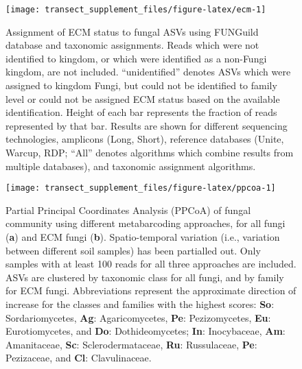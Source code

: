 \documentclass[
]{article}
\begin{document}
\begin{figure}

{\centering \texttt{[image: transect\_supplement\_files/figure-latex/ecm-1]} 

}

\caption[Assignment of ECM status to fungal ASVs using FUNGuild database and taxonomic assignments]{Assignment of ECM status to fungal ASVs using FUNGuild database and taxonomic assignments. Reads which were not identified to kingdom, or which were identified as a non-Fungi kingdom, are not included.
``unidentified'' denotes ASVs which were assigned to kingdom Fungi, but could not be identified to family level or could not be assigned ECM status based on the available identification.
Height of each bar represents the fraction of reads represented by that bar.
Results are shown for different sequencing technologies, amplicons (Long, Short), reference databases (Unite, Warcup, RDP; ``All'' denotes algorithms which combine results from multiple databases), and taxonomic assignment algorithms.}\label{fig:ecm}
\end{figure}









\begin{figure}

{\centering \texttt{[image: transect\_supplement\_files/figure-latex/ppcoa-1]} 

}

\caption[Partial Principal Coordinates Analysis (PPCoA) of fungal community using different metabarcoding approaches]{Partial Principal Coordinates Analysis (PPCoA) of fungal community using different metabarcoding approaches, for all fungi (\textbf{a}) and ECM fungi (\textbf{b}).
Spatio-temporal variation (i.e., variation between different soil samples) has been partialled out.
Only samples with at least 100 reads for all three approaches are included.
ASVs are clustered by taxonomic class for all fungi, and by family for ECM fungi.
Abbreviations represent the approximate direction of increase for the classes and families with the highest scores: \textbf{So}: Sordariomycetes, \textbf{Ag}: Agaricomycetes, \textbf{Pe}: Pezizomycetes, \textbf{Eu}: Eurotiomycetes, and \textbf{Do}: Dothideomycetes; \textbf{In}: Inocybaceae, \textbf{Am}: Amanitaceae, \textbf{Sc}: Sclerodermataceae, \textbf{Ru}: Russulaceae, \textbf{Pe}: Pezizaceae, and \textbf{Cl}: Clavulinaceae.}\label{fig:ppcoa}
\end{figure}
\end{document}
